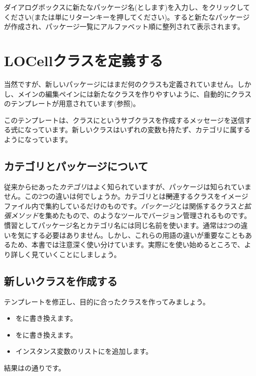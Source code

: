 \documentclass[a4paper,10pt,twoside]{book}
\begin{document}
ダイアログボックスに新たなパッケージ名(とします)を入力し、をクリックしてください(または単にリターンキーを押してください)。すると新たなパッケージが作成され、パッケージ一覧にアルファベット順に整列されて表示されます。

\section{LOCellクラスを定義する}

当然ですが、新しいパッケージにはまだ何のクラスも定義されていません。しかし、メインの編集ペインには新たなクラスを作りやすいように、自動的にクラスのテンプレートが用意されています(参照)。

このテンプレートは、クラスにというサブクラスを作成するメッセージを送信する\st 式になっています。新しいクラスはいずれの変数も持たず、カテゴリに属するようになっています。

\subsection{カテゴリとパッケージについて}

従来から\st にあった\emph{カテゴリ}はよく知られていますが、パッケージは知られていません。この2つの違いは何でしょうか。カテゴリとは\st 関連するクラスをイメージファイル内で集約しているだけのものです。\emph{パッケージ}とは関係するクラス\emph{と拡張メソッド}を集めたもので、のようなツールでバージョン管理されるものです。慣習としてパッケージ名とカテゴリ名には同じ名前を使います。通常は2つの違いを気にする必要はありません。しかし、これらの用語の違いが重要なこともあるため、本書では注意深く使い分けています。実際にを使い始めるところで、より詳しく見ていくことにしましょう。


\subsection{新しいクラスを作成する}

テンプレートを修正し、目的に合ったクラスを作ってみましょう。

\begin{itemize}
  \item {}をに書き換えます。
  \item {}をに書き換えます。
  \item インスタンス変数のリストにを追加します。
\end{itemize}
結果はの通りです。
\end{document}
